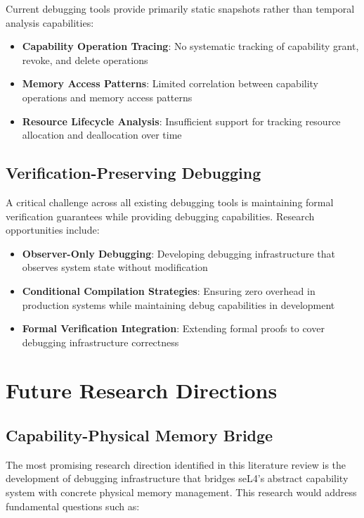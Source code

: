 \documentclass[11pt,a4paper]{article}
\begin{document}
\begin{subsubsection}
Current debugging tools provide primarily static snapshots rather than temporal analysis capabilities:

\begin{itemize}
\item \textbf{Capability Operation Tracing}: No systematic tracking of capability grant, revoke, and delete operations
\item \textbf{Memory Access Patterns}: Limited correlation between capability operations and memory access patterns
\item \textbf{Resource Lifecycle Analysis}: Insufficient support for tracking resource allocation and deallocation over time
\end{itemize}

\subsection{Verification-Preserving Debugging}

A critical challenge across all existing debugging tools is maintaining formal verification guarantees while providing debugging capabilities. Research opportunities include:

\begin{itemize}
\item \textbf{Observer-Only Debugging}: Developing debugging infrastructure that observes system state without modification
\item \textbf{Conditional Compilation Strategies}: Ensuring zero overhead in production systems while maintaining debug capabilities in development
\item \textbf{Formal Verification Integration}: Extending formal proofs to cover debugging infrastructure correctness
\end{itemize}

\section{Future Research Directions}

\subsection{Capability-Physical Memory Bridge}

The most promising research direction identified in this literature review is the development of debugging infrastructure that bridges seL4's abstract capability system with concrete physical memory management. This research would address fundamental questions such as:


\end{subsubsection}
\end{document}
